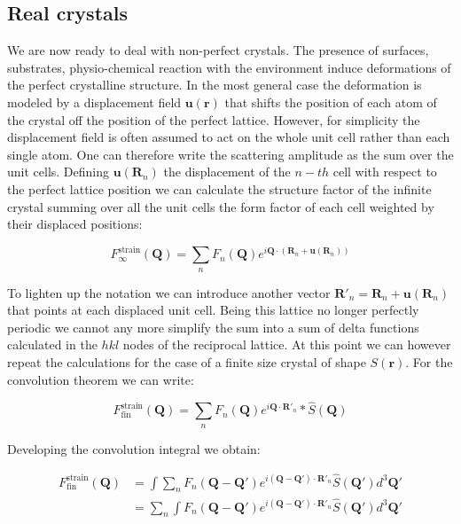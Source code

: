 \subsection{Real crystals}
We are now ready to deal with non-perfect crystals. The presence of surfaces, substrates, physio-chemical reaction with 
the environment induce deformations of the perfect crystalline structure. In the most general case the deformation is 
modeled by a displacement field $\mathbf{u(r)}$ 
that shifts the position of each atom of the crystal off the position of the perfect lattice. However, for simplicity 
the displacement field is often assumed to act on the whole unit cell rather than each single atom. One can therefore 
write the scattering amplitude as the sum over the unit cells. 
Defining $\mathbf{u}(\mathbf{R}_n)$ the displacement of the $n-th$ cell with respect to the perfect lattice position 
we can calculate the structure factor of the infinite crystal summing over all the unit cells the form factor of each cell weighted by 
their displaced positions: 

\begin{equation}
    F^{\text{strain}}_{\infty}(\mathbf{Q}) = 
    \sum_{n} F_n(\mathbf{Q}) e^{i \mathbf{Q} \cdot (\mathbf{R}_n + \mathbf{u}(\mathbf{R}_n))}
   \label{eq:strain1}
\end{equation} 

To lighten up the notation we can introduce another vector $\mathbf{R}'_n = \mathbf{R}_n + \mathbf{u}(\mathbf{R}_n)$ that 
points at each displaced unit cell. Being this lattice no longer perfectly periodic we cannot any more simplify the sum 
into a sum of delta functions calculated in the $hkl$ nodes of the reciprocal lattice. 
At this point we can however repeat the calculations for the case of a finite size crystal of shape $S(\mathbf{r})$. 
For the convolution theorem we can write: 

\begin{equation}
    F^{\text{strain}}_{\text{fin}}(\mathbf{Q}) = 
    \sum_{n} F_n(\mathbf{Q}) e^{i \mathbf{Q} \cdot \mathbf{R}'_n} \ast \widehat{S}(\mathbf{Q})
   \label{eq:strain_fin}
\end{equation}

Developing the convolution integral we obtain: 

\begin{equation}
    \begin{aligned}
    F^{\text{strain}}_{\text{fin}}(\mathbf{Q}) &= 
    \int \sum_{n} F_n(\mathbf{Q} -\mathbf{Q'}) e^{i (\mathbf{Q}-\mathbf{Q'}) \cdot \mathbf{R}'_n} \widehat{S}(\mathbf{Q'})d^3\mathbf{Q'} \\
    &= \sum_{n} \int F_n(\mathbf{Q} -\mathbf{Q'}) e^{i (\mathbf{Q}-\mathbf{Q'}) \cdot \mathbf{R}'_n} \widehat{S}(\mathbf{Q'})d^3\mathbf{Q'} \\ 
   \label{eq:strain_fin2}
    \end{aligned}
\end{equation}


